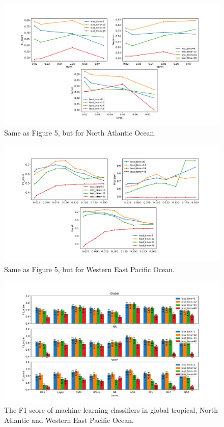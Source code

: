 \documentclass{article}
\begin{document}
\begin{figure}[h] %
\includegraphics[width=30pc]{figs/GPI_thres_NA_f1.pdf}
\caption{Same as Figure 5, but for North Atlantic Ocean. }
\label{figone}
\end{figure}

\begin{figure}[h] %
\includegraphics[width=30pc]{figs/GPI_thres_WNP_f1.pdf}
\caption{Same as Figure 5, but for Western East Pacific Ocean.}
\label{figone}    
\end{figure}

\begin{figure}[h] %
\includegraphics[width=30pc]{figs/alg_F1.pdf}
\caption{The F1 score of machine learning classifiers in global tropical, North Atlantic 
and Western East Pacific Ocean.}
\label{figone}    
\end{figure}
\end{document}
